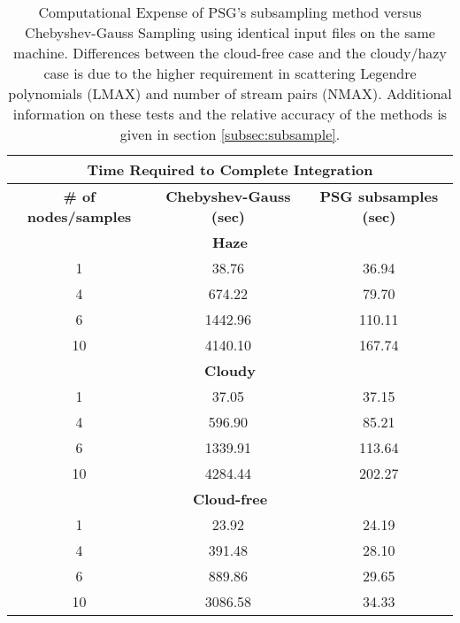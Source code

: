 \documentclass[12pt, letterpaper]{aastex631}
\begin{document}
\begin{table}[]
\begin{tabular}{|c|c|c}
\hline
\multicolumn{3}{|c|}{\textbf{Time Required to Complete Integration}}                                               \\ \hline
\textbf{\# of nodes/samples} & \textbf{Chebyshev-Gauss (sec)} & \multicolumn{1}{c|}{\textbf{PSG subsamples (sec)}} \\ \hline
\multicolumn{3}{|c|}{\textbf{Haze}}        \\ \hline
1  & 38.76   & \multicolumn{1}{c|}{36.94}  \\ \hline
4  & 674.22  & \multicolumn{1}{c|}{79.70}  \\ \hline
6  & 1442.96 & \multicolumn{1}{c|}{110.11} \\ \hline
10 & 4140.10 & \multicolumn{1}{c|}{167.74} \\ \hline
\multicolumn{3}{|c|}{\textbf{Cloudy}}      \\ \hline
1  & 37.05   & \multicolumn{1}{c|}{37.15}  \\ \hline
4  & 596.90  & \multicolumn{1}{c|}{85.21}  \\ \hline
6  & 1339.91 & \multicolumn{1}{c|}{113.64} \\ \hline
10 & 4284.44 & \multicolumn{1}{c|}{202.27} \\ \hline
\multicolumn{3}{|c|}{\textbf{Cloud-free}}  \\ \hline
1  & 23.92   & \multicolumn{1}{c|}{24.19}  \\ \hline
4  & 391.48  & \multicolumn{1}{c|}{28.10}  \\ \hline
6  & 889.86  & \multicolumn{1}{c|}{29.65}  \\ \hline
10 & 3086.58 & \multicolumn{1}{c|}{34.33}  \\ \hline
\end{tabular}
  \caption{Computational Expense of PSG's subsampling method versus Chebyshev-Gauss Sampling using identical input files on the same machine. Differences between the cloud-free case and the cloudy/hazy case is due to the higher requirement in scattering Legendre polynomials (LMAX) and number of stream pairs (NMAX).  Additional information on these tests and the relative accuracy of the methods is given in section \ref{subsec:subsample}.}%
  \label{table:compexpense}
\end{table}
 
\end{document}
